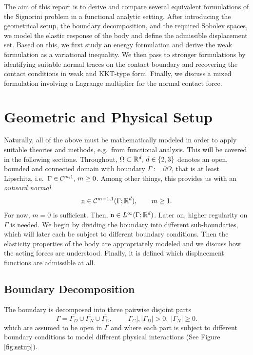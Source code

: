 The aim of this report is to derive and compare several equivalent formulations of the Signorini problem in a functional analytic setting. After introducing the geometrical setup, the boundary decomposition, and the required Sobolev spaces, we model the elastic response of the body and define the admissible displacement set. Based on this, we first study an energy formulation and derive the weak formulation as a variational inequality. We then pass to stronger formulations by identifying suitable normal traces on the contact boundary and recovering the contact conditions in weak and KKT-type form. Finally, we discuss a mixed formulation involving a Lagrange multiplier for the normal contact force.

\newpage
\section{Geometric and Physical Setup}

Naturally, all of the above must be mathematically modeled in order to apply suitable theories and methods, e.g.\ from functional analysis. This will be covered in the following sections. Throughout, $\Omega\subset {\mathbb R}^d,\, d\in\{2,3\}$ denotes an open, bounded and connected domain with boundary $\Gamma:=\partial\Omega$, that is at least Lipschitz, i.e.\ $\Gamma\in {\mathcal C}^{m,1},\, m\ge 0$. Among other things, this provides us with an {\em outward normal}
\begin{equation*}
	\mathrm{n}\in{\mathcal C}^{m-1,1}(\Gamma;{\mathbb R}^d),\qquad m\ge 1.
\end{equation*}
For now, $m = 0$ is sufficient. Then, $\mathrm{n}\in L^\infty(\Gamma;{\mathbb R}^d)$. Later on, higher regularity on $\Gamma$ is needed. We begin by dividing the boundary into different sub-boundaries, which will later each be subject to different boundary conditions. Then the elasticity properties of the body are appropriately modeled and we discuss how the acting forces are understood. Finally, it is defined which displacement functions are admissible at all.

\subsection{Boundary Decomposition}

The boundary is decomposed into three pairwise disjoint parts
\begin{equation*}
	\Gamma = \overline{\Gamma_D}\cup\overline{\Gamma_N}\cup\overline{\Gamma_C},\qquad |\Gamma_C|,|\Gamma_D|>0,\;|\Gamma_N|\ge 0.
\end{equation*}
which are assumed to be open in $\Gamma$ and where each part is subject to different boundary conditions to model different physical interactions (See Figure \ref{fig:setup}).

